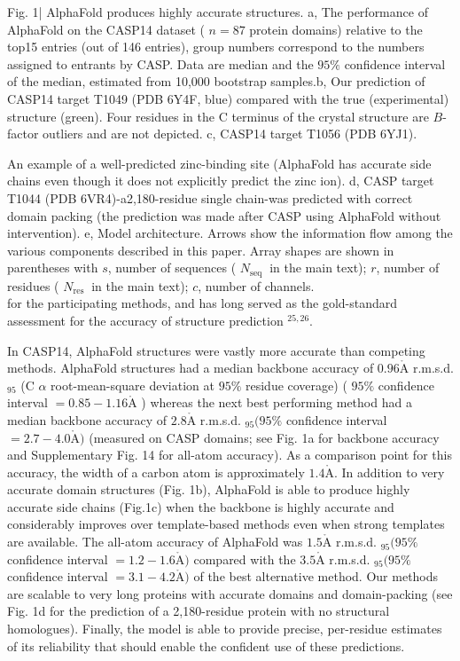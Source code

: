 \documentclass[10pt]{article}
\def\AA{\mathring{\mathrm{A}}}
\begin{document}
Fig. 1| AlphaFold produces highly accurate structures. a, The performance of AlphaFold on the CASP14 dataset ( $n=87$ protein domains) relative to the top15 entries (out of 146 entries), group numbers correspond to the numbers assigned to entrants by CASP. Data are median and the $95 \%$ confidence interval of the median, estimated from 10,000 bootstrap samples.b, Our prediction of CASP14 target T1049 (PDB 6Y4F, blue) compared with the true (experimental) structure (green). Four residues in the C terminus of the crystal structure are $B$-factor outliers and are not depicted. c, CASP14 target T1056 (PDB 6YJ1).

An example of a well-predicted zinc-binding site (AlphaFold has accurate side chains even though it does not explicitly predict the zinc ion). d, CASP target T1044 (PDB 6VR4)-a2,180-residue single chain-was predicted with correct domain packing (the prediction was made after CASP using AlphaFold without intervention). e, Model architecture. Arrows show the information flow among the various components described in this paper. Array shapes are shown in parentheses with $s$, number of sequences ( $N_{\text {seq }}$ in the main text); $r$, number of residues ( $N_{\text {res }}$ in the main text); $c$, number of channels.\\
for the participating methods, and has long served as the gold-standard assessment for the accuracy of structure prediction ${ }^{25,26}$.

In CASP14, AlphaFold structures were vastly more accurate than competing methods. AlphaFold structures had a median backbone accuracy of $0.96 \AA$ r.m.s.d. ${ }_{95}$ (C $\alpha$ root-mean-square deviation at $95 \%$ residue coverage) ( $95 \%$ confidence interval $=0.85-1.16 \AA$ ) whereas the next best performing method had a median backbone accuracy of $2.8 \AA$ r.m.s.d. ${ }_{95}(95 \%$ confidence interval $=2.7-4.0 \AA)$ (measured on CASP domains; see Fig. 1a for backbone accuracy and Supplementary Fig. 14 for all-atom accuracy). As a comparison point for this accuracy, the width of a carbon atom is approximately $1.4 \AA$. In addition to very accurate domain structures (Fig. 1b), AlphaFold is able to produce highly accurate side chains (Fig.1c) when the backbone is highly accurate and considerably improves over template-based methods even when strong templates are available. The all-atom accuracy of AlphaFold was $1.5 \AA$ r.m.s.d. ${ }_{95}(95 \%$ confidence interval $=1.2-1.6 \AA)$ compared with the $3.5 \AA$ r.m.s.d. ${ }_{95}(95 \%$ confidence interval $=3.1-4.2 \AA)$ of the best alternative method. Our methods are scalable to very long proteins with accurate domains and domain-packing (see Fig. 1d for the prediction of a 2,180-residue protein with no structural homologues). Finally, the model is able to provide precise, per-residue estimates of its reliability that should enable the confident use of these predictions.
\end{document}
